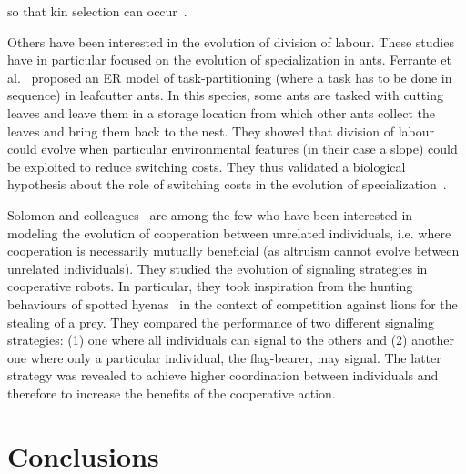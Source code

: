 so that kin selection can occur~\parencite{VanBaalen1998}. 

        Others have been interested in the evolution of division of labour. These studies have in particular focused on the evolution of specialization in ants. Ferrante et al.~\parencite{Ferrante2015} proposed an ER model of task-partitioning (where a task has to be done in sequence) in leafcutter ants. In this species, some ants are tasked with cutting leaves and leave them in a storage location from which other ants collect the leaves and bring them back to the nest. They showed that division of labour could evolve when particular environmental features (in their case a slope) could be exploited to reduce switching costs. They thus validated a biological hypothesis about the role of switching costs in the evolution of specialization~\parencite{Duarte2011}. 


        Solomon and colleagues~\parencite{Solomon2012} are among the few who have been interested in modeling the evolution of cooperation between unrelated individuals, i.e. where cooperation is necessarily mutually beneficial (as altruism cannot evolve between unrelated individuals). They studied the evolution of signaling strategies in cooperative robots. In particular, they took inspiration from the hunting behaviours of spotted hyenas~\parencite{Smith2012a} in the context of competition against lions for the stealing of a prey. They compared the performance of two different signaling strategies: (1) one where all individuals can signal to the others and (2) another one where only a particular individual, the flag-bearer, may signal. The latter strategy was revealed to achieve higher coordination between individuals and therefore to increase the benefits of the cooperative action.


\section{Conclusions}

